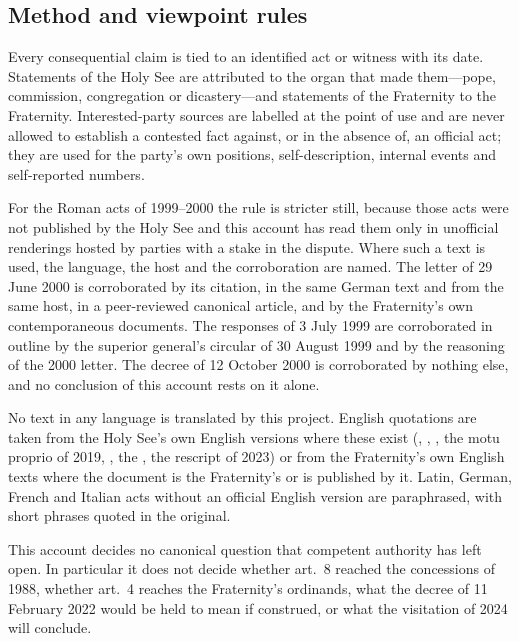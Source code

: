 \subsection{Method and viewpoint rules}

Every consequential claim is tied to an identified act or witness with its
date. Statements of the Holy See are attributed to the organ that made
them---pope, commission, congregation or dicastery---and statements of the
Fraternity to the Fraternity. Interested-party sources are labelled at the
point of use and are never allowed to establish a contested fact against,
or in the absence of, an official act; they are used for the party's own
positions, self-description, internal events and self-reported numbers.

For the Roman acts of 1999--2000 the rule is stricter still, because those
acts were not published by the Holy See and this account has read them only
in unofficial renderings hosted by parties with a stake in the dispute.
Where such a text is used, the language, the host and the corroboration
are named. The letter of 29 June 2000 is corroborated by its citation, in
the same German text and from the same host, in a peer-reviewed canonical
article, and by the Fraternity's own contemporaneous documents. The
responses of 3 July 1999 are corroborated in outline by the superior
general's circular of 30 August 1999 and by the reasoning of the 2000
letter. The decree of 12 October 2000 is corroborated by nothing else, and
no conclusion of this account rests on it alone.

No text in any language is translated by this project. English quotations
are taken from the Holy See's own English versions where these exist
(, , , the motu proprio of 2019, , the
, the rescript of 2023) or from the Fraternity's own
English texts where the document is the Fraternity's or is published by
it. Latin, German, French and Italian acts without an official English
version are paraphrased, with short phrases quoted in the original.

This account decides no canonical question that competent authority has
left open. In particular it does not decide whether  art.~8 reached the concessions of 1988, whether art.~4 reaches
the Fraternity's ordinands, what the decree of 11 February 2022 would be
held to mean if construed, or what the visitation of 2024 will conclude.

